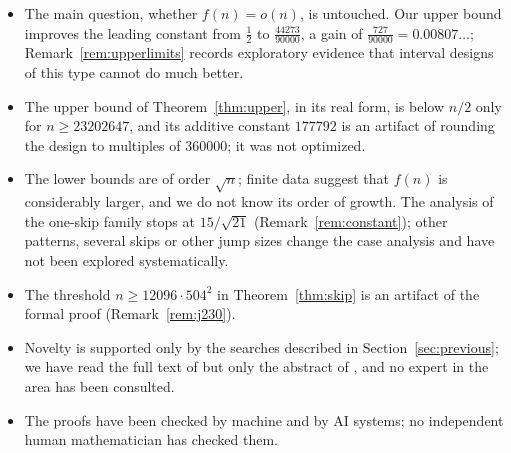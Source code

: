 \documentclass[11pt]{amsart}
\theoremstyle{remark}
\begin{document}
\begin{itemize}
\item The main question, whether $f(n)=o(n)$, is untouched. Our upper bound improves the leading constant from $\frac12$ to
$\frac{44273}{90000}$, a gain of $\frac{727}{90000}=0.00807\ldots$; Remark~\ref{rem:upperlimits} records exploratory evidence that interval designs of this type cannot do much better.
\item The upper bound of Theorem~\ref{thm:upper}, in its real form, is below $n/2$ only for $n\ge23202647$, and its additive constant $177792$ is an
artifact of rounding the design to multiples of $360000$; it was not optimized.
\item The lower bounds are of order $\sqrt n$; finite data suggest that $f(n)$ is considerably larger, and we do not know its order of
growth. The analysis of the one-skip family stops at $15/\sqrt{21}$ (Remark~\ref{rem:constant}); other patterns, several skips or other
jump sizes change the case analysis and have not been explored systematically.
\item The threshold $n\ge12096\cdot504^2$ in Theorem~\ref{thm:skip} is an artifact of the formal proof (Remark~\ref{rem:j230}).
\item Novelty is supported only by the searches described in Section~\ref{sec:previous}; we have read the full text of
\cite{Hegyvari1986} but only the abstract of \cite{CoppersmithPhillips1996}, and no expert in the area has been consulted.
\item The proofs have been checked by machine and by AI systems; no independent human mathematician has checked them.
\end{itemize}
\end{document}
